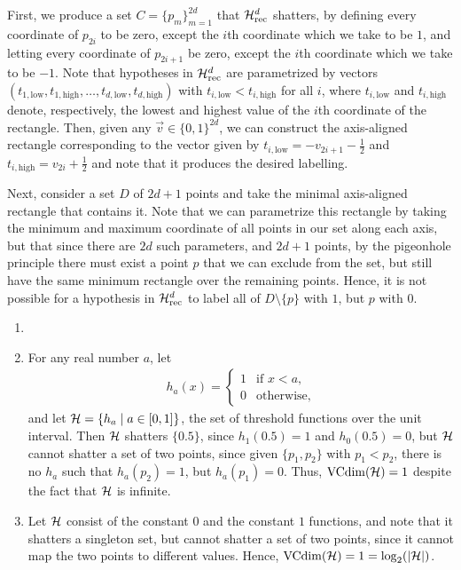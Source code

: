 \begin{ex}
  First, we produce a set $C=\{p_m\}_{m=1}^{2d}$ that $\mathcal{H}_{\text{rec}}^d$
  shatters, by defining every coordinate of $p_{2i}$ to be zero, except the
  $i$th coordinate which we take to be $1$, and letting every coordinate of
  ${p_{2i+1}}$ be zero, except the $i$th coordinate which we take to be $-1$.
  Note that hypotheses in $\mathcal{H}_{\text{rec}}^d$ are parametrized by vectors
  $(t_{1,\text{low}}, t_{1,\text{high}},\ldots,t_{d,\text{low}},t_{d,\text{high}})$
  with $t_{i,\text{low}}<t_{i,\text{high}}$ for all $i$, where
  $t_{i,\text{low}}$ and $t_{i,\text{high}}$ denote, respectively, the lowest
  and highest value of the $i$th coordinate of the rectangle. Then, given any
  $\vec{v}\in\{0, 1\}^{2d}$, we can construct the axis-aligned rectangle corresponding
  to the vector given by $t_{i,\text{low}}=-v_{2i+1}-\frac{1}{2}$ and
  $t_{i,\text{high}}=v_{2i}+\frac{1}{2}$ and note that it produces the desired
  labelling.

  Next, consider a set $D$ of $2d+1$ points and take the minimal axis-aligned
  rectangle that contains it. Note that we can parametrize this rectangle by
  taking the minimum and maximum coordinate of all points in our set along each
  axis, but that since there are $2d$ such parameters, and $2d+1$ points, by the
  pigeonhole principle there must exist a point $p$ that we can exclude from the
  set, but still have the same minimum rectangle over the remaining points.
  Hence, it is not possible for a hypothesis in $\mathcal{H}_{\text{rec}}^d$ to label all
  of $D\setminus\{p\}$ with $1$, but $p$ with $0$.
\end{ex}

\begin{ex}
\end{ex}

\begin{ex}
  \begin{enumerate}
    \item[]
    \item For any real number $a$, let
          \begin{align*}
            h_a(x)=\begin{cases}
              1 & \text{if $x < a$}, \\
              0 & \text{otherwise},
            \end{cases}
          \end{align*}
          and let $\mathcal{H}=\{h_a \mid a\in [0, 1] \}$, the set of threshold
          functions over the unit interval. Then $\mathcal{H}$ shatters
          $\{0.5\}$, since $h_1(0.5)=1$ and $h_0(0.5)=0$, but $\mathcal{H}$
          cannot shatter a set of two points, since given $\{p_1, p_2\}$ with
          $p_1 < p_2$, there is no $h_a$ such that $h_a(p_2) = 1$, but
          $h_a(p_1)=0$. Thus, $\operatorname*{VCdim}(\mathcal{H})=1$ despite the fact that $\mathcal{H}$ is
          infinite.
    \item Let $\mathcal{H}$ consist of the constant $0$ and the constant $1$ functions,
          and note that it shatters a singleton set, but cannot shatter a set of
          two points, since it cannot map the two points to different values.
          Hence, $\operatorname*{VCdim}(\mathcal{H})=1=\log_2(|\mathcal{H}|)$.
  \end{enumerate}
\end{ex}

